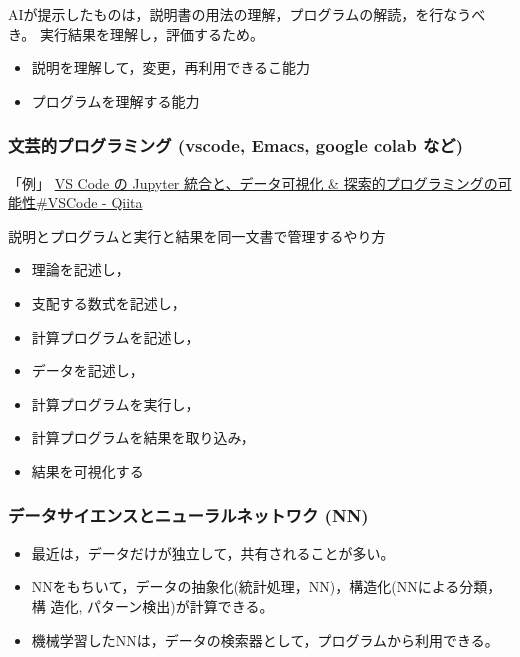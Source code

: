 \documentclass[dvipdfmx,11pat]{jarticle}
\begin{document}
AIが提示したものは，説明書の用法の理解，プログラムの解読，を行なうべき。
実行結果を理解し，評価するため。
\begin{itemize}
\item 説明を理解して，変更，再利用できるこ能力
\item プログラムを理解する能力
\end{itemize}
\subsubsection{文芸的プログラミング (vscode, Emacs, google colab など)}
\label{sec:orgfb56e32}
「例」 \href{https://qiita.com/kikuchi\_kentaro/items/6c011c1e85f7e9cce910}{VS Code の Jupyter 統合と、データ可視化 \& 探索的プログラミングの可能性\#VSCode - Qiita} 

説明とプログラムと実行と結果を同一文書で管理するやり方
\begin{itemize}
\item 理論を記述し，
\item 支配する数式を記述し，
\item 計算プログラムを記述し，
\item データを記述し，
\item 計算プログラムを実行し，
\item 計算プログラムを結果を取り込み，
\item 結果を可視化する
\end{itemize}
\subsubsection{データサイエンスとニューラルネットワク (NN)}
\label{sec:orgc0d2e51}

\begin{itemize}
\item 最近は，データだけが独立して，共有されることが多い。
\item NNをもちいて，データの抽象化(統計処理，NN)，構造化(NNによる分類，構
造化, パターン検出)が計算できる。
\item 機械学習したNNは，データの検索器として，プログラムから利用できる。
\end{itemize}
\end{document}
